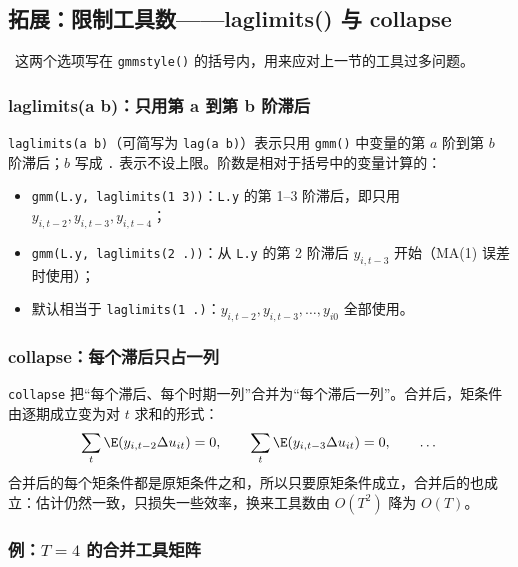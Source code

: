 \subsection{拓展：限制工具数——laglimits() 与 collapse}\label{sec:U12c-collapse}

\tagext\ 这两个选项写在 \texttt{gmmstyle()} 的括号内，用来应对上一节的工具过多问题。

\subsubsection{laglimits(a b)：只用第 a 到第 b 阶滞后}

\texttt{laglimits(a b)}（可简写为 \texttt{lag(a b)}）表示只用 \texttt{gmm()} 中变量的第 $a$ 阶到第 $b$ 阶滞后；$b$ 写成 \texttt{.} 表示不设上限。阶数是相对于括号中的变量计算的：
\begin{itemize}
  \item \texttt{gmm(L.y, laglimits(1 3))}：\texttt{L.y} 的第 1--3 阶滞后，即只用 $y_{i,t-2},y_{i,t-3},y_{i,t-4}$；
  \item \texttt{gmm(L.y, laglimits(2 .))}：从 \texttt{L.y} 的第 2 阶滞后 $y_{i,t-3}$ 开始（MA(1) 误差时使用）；
  \item 默认相当于 \texttt{laglimits(1 .)}：$y_{i,t-2},y_{i,t-3},\dots,y_{i0}$ 全部使用。
\end{itemize}

\subsubsection{collapse：每个滞后只占一列}

\texttt{collapse} 把“每个滞后、每个时期一列”合并为“每个滞后一列”。合并后，矩条件由逐期成立变为对 $t$ 求和的形式：
\[
\sum_t\E(y_{i,t-2}\Delta u_{it})=0,\qquad \sum_t\E(y_{i,t-3}\Delta u_{it})=0,\qquad\dots
\]
合并后的每个矩条件都是原矩条件之和，所以只要原矩条件成立，合并后的也成立：估计仍然一致，只损失一些效率，换来工具数由 $O(T^2)$ 降为 $O(T)$。

\subsubsection{例：\texorpdfstring{$T=4$}{T=4} 的合并工具矩阵}

